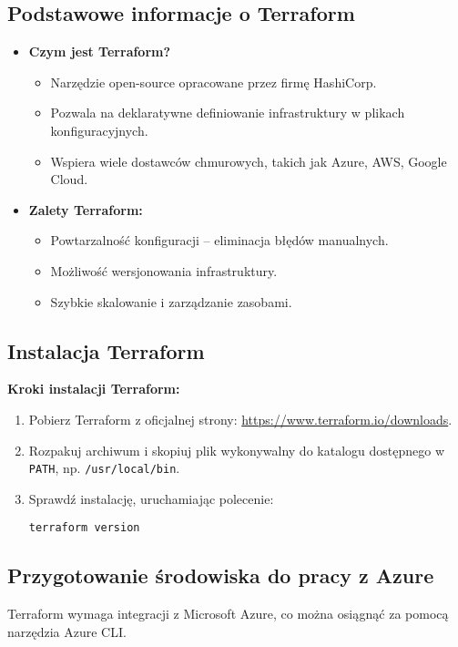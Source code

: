 \documentclass{article}
\begin{document}
\subsection{Podstawowe informacje o Terraform}
\begin{itemize}
    \item \textbf{Czym jest Terraform?}
    \begin{itemize}
        \item Narzędzie open-source opracowane przez firmę HashiCorp.
        \item Pozwala na deklaratywne definiowanie infrastruktury w plikach konfiguracyjnych.
        \item Wspiera wiele dostawców chmurowych, takich jak Azure, AWS, Google Cloud.
    \end{itemize}
    \item \textbf{Zalety Terraform:}
    \begin{itemize}
        \item Powtarzalność konfiguracji – eliminacja błędów manualnych.
        \item Możliwość wersjonowania infrastruktury.
        \item Szybkie skalowanie i zarządzanie zasobami.
    \end{itemize}
\end{itemize}

\subsection{Instalacja Terraform}
\textbf{Kroki instalacji Terraform:}
\begin{enumerate}
    \item Pobierz Terraform z oficjalnej strony: \url{https://www.terraform.io/downloads}.
    \item Rozpakuj archiwum i skopiuj plik wykonywalny do katalogu dostępnego w \texttt{PATH}, np. \texttt{/usr/local/bin}.
    \item Sprawdź instalację, uruchamiając polecenie:
    \begin{lstlisting}
terraform version
    \end{lstlisting}
\end{enumerate}

\subsection{Przygotowanie środowiska do pracy z Azure}
Terraform wymaga integracji z Microsoft Azure, co można osiągnąć za pomocą narzędzia Azure CLI.
\end{document}
